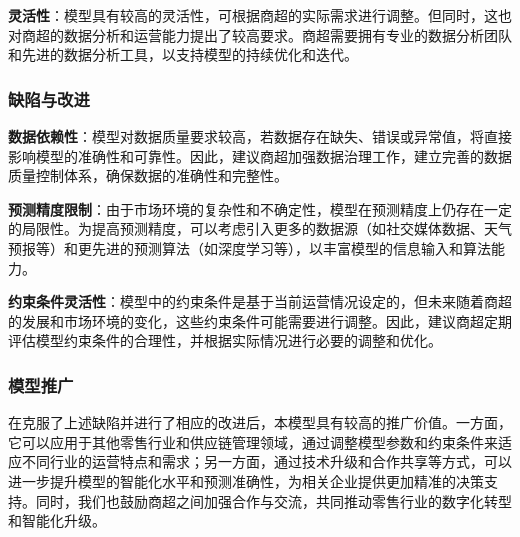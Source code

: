\documentclass{cumcmthesis}
\begin{document}
\textbf{灵活性}：模型具有较高的灵活性，可根据商超的实际需求进行调整。但同时，这也对商超的数据分析和运营能力提出了较高要求。商超需要拥有专业的数据分析团队和先进的数据分析工具，以支持模型的持续优化和迭代。

\subsubsection{缺陷与改进}

\textbf{数据依赖性}：模型对数据质量要求较高，若数据存在缺失、错误或异常值，将直接影响模型的准确性和可靠性。因此，建议商超加强数据治理工作，建立完善的数据质量控制体系，确保数据的准确性和完整性。

\textbf{预测精度限制}：由于市场环境的复杂性和不确定性，模型在预测精度上仍存在一定的局限性。为提高预测精度，可以考虑引入更多的数据源（如社交媒体数据、天气预报等）和更先进的预测算法（如深度学习等），以丰富模型的信息输入和算法能力。

\textbf{约束条件灵活性}：模型中的约束条件是基于当前运营情况设定的，但未来随着商超的发展和市场环境的变化，这些约束条件可能需要进行调整。因此，建议商超定期评估模型约束条件的合理性，并根据实际情况进行必要的调整和优化。

\subsubsection{模型推广}
在克服了上述缺陷并进行了相应的改进后，本模型具有较高的推广价值。一方面，它可以应用于其他零售行业和供应链管理领域，通过调整模型参数和约束条件来适应不同行业的运营特点和需求；另一方面，通过技术升级和合作共享等方式，可以进一步提升模型的智能化水平和预测准确性，为相关企业提供更加精准的决策支持。同时，我们也鼓励商超之间加强合作与交流，共同推动零售行业的数字化转型和智能化升级。


\newpage
\end{document}

